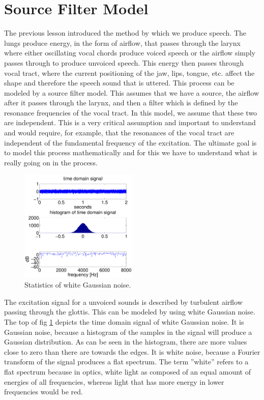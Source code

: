 \clearpage
\section{Source Filter Model}
\label{Source Filter Model}

The previous lesson introduced the method by which we produce speech. The lungs produce energy, in the form of airflow, that passes through the larynx where either oscillating vocal chords produce voiced speech or the airflow simply passes through to produce unvoiced speech.  This energy then passes through vocal tract, where the current positioning of the jaw, lips, tongue, etc. affect the shape and therefore the speech sound that is uttered.  This process can be modeled by a source filter model.  This assumes that we have a source, the airflow after it passes through the larynx, and then a filter which is defined by the resonance frequencies of the vocal tract. In this model, we assume that these two are independent. This is a very critical assumption and important to understand and would require, for example, that the resonances of the vocal tract are independent of the fundamental frequency of the excitation. The ultimate goal is to model this process mathematically and for this we have to understand what is really going on in the process. \\

\begin{figure}
    \includegraphics[width=0.5\textwidth]{Pictures/Chapter1_Lesson3/gaussianNoise-eps-converted-to.pdf}
    \caption{Statistics of white Gaussian noise.}
    \label{gaussNoise}
\end{figure}

The excitation signal for a unvoiced sounds is described  by turbulent airflow passing through the glottis. This can be modeled by using white Gaussian noise. The top of fig \ref{gaussNoise} depicts the time domain signal of white Gaussian noise. It is Gaussian noise, because a histogram of the samples in the signal will produce a Gaussian distribution. As can be seen in the histogram, there are more values close to zero than there are towards the edges. It is white noise, because a Fourier transform of the signal produces a flat spectrum.  The term ''white'' refers to a flat spectrum because in optics, white light as composed of an equal amount of energies of all frequencies, whereas light that has more energy in lower frequencies would be red.\\



